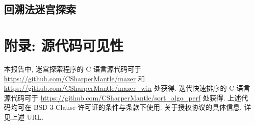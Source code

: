 \documentclass[12pt]{article}
\begin{document}
\subsection{回溯法迷宫探索}



\section{附录: 源代码可见性}
\label{appendix_source_code}

本报告中, 迷宫探索程序的 C 语言源代码可于 \url{https://github.com/CSharperMantle/mazer} 和 \url{https://github.com/CSharperMantle/mazer_win} 处获得. 迭代快速排序的 C 语言源代码可于 \url{https://github.com/CSharperMantle/sort_algo_perf} 处获得. 上述代码均可在 BSD 3-Clause 许可证的条件与条款下使用. 关于授权协议的具体信息, 详见上述 URL.
\end{document}
